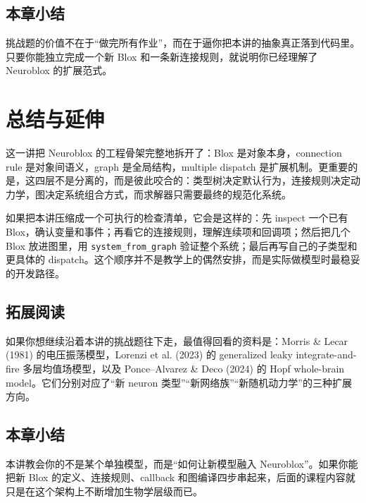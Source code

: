 \documentclass[a4paper]{article}
\begin{document}
\subsection{本章小结}
挑战题的价值不在于“做完所有作业”，而在于逼你把本讲的抽象真正落到代码里。只要你能独立完成一个新 Blox 和一条新连接规则，就说明你已经理解了 Neuroblox 的扩展范式。

\section{总结与延伸}
这一讲把 Neuroblox 的工程骨架完整地拆开了：Blox 是对象本身，connection rule 是对象间语义，graph 是全局结构，multiple dispatch 是扩展机制。更重要的是，这四层不是分离的，而是彼此咬合的：类型树决定默认行为，连接规则决定动力学，图决定系统组合方式，而求解器只需要最终的规范化系统。

如果把本讲压缩成一个可执行的检查清单，它会是这样的：先 inspect 一个已有 Blox，确认变量和事件；再看它的连接规则，理解连续项和回调项；然后把几个 Blox 放进图里，用 \texttt{system\_from\_graph} 验证整个系统；最后再写自己的子类型和更具体的 dispatch。这个顺序并不是教学上的偶然安排，而是实际做模型时最稳妥的开发路径。

\subsection{拓展阅读}
如果你想继续沿着本讲的挑战题往下走，最值得回看的资料是：Morris \& Lecar (1981) 的电压振荡模型，Lorenzi et al. (2023) 的 generalized leaky integrate-and-fire 多层均值场模型，以及 Ponce--Alvarez \& Deco (2024) 的 Hopf whole-brain model。它们分别对应了“新 neuron 类型”“新网络族”“新随机动力学”的三种扩展方向。

\subsection{本章小结}
本讲教会你的不是某个单独模型，而是“如何让新模型融入 Neuroblox”。如果你能把新 Blox 的定义、连接规则、callback 和图编译四步串起来，后面的课程内容就只是在这个架构上不断增加生物学层级而已。
\end{document}
